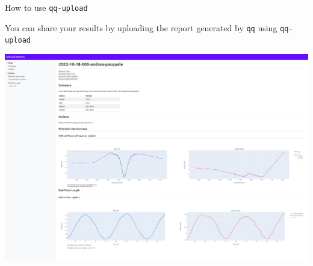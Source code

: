 \documentclass[11p,aspectratio=169]{beamer}
\begin{document}
\begin{frame}{How to use \texttt{qq-upload}}
    
    You can share your results by uploading the report generated by \texttt{qq} using \texttt{qq-upload}
    \vspace{0.3cm}
    
    \includegraphics[width=\textwidth]{figures/upload.png}
\end{frame}
\end{document}
